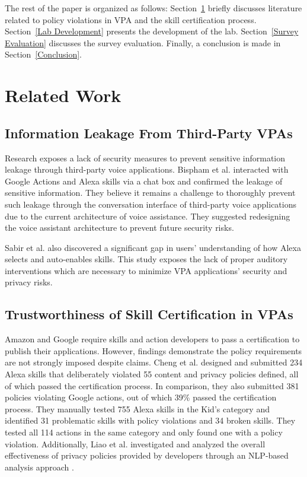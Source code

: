 \documentclass{article}
\begin{document}
The rest of the paper is organized as follows: Section~\ref{Related Work} briefly discusses literature related to policy violations in VPA and the skill certification process. Section~\ref{Lab Development} presents the development of the lab. Section~\ref{Survey Evaluation} discusses the survey evaluation. Finally, a conclusion is made in Section~\ref{Conclusion}.

\section{Related Work}\label{Related Work}

\subsection{Information Leakage From Third-Party VPAs}
Research exposes a lack of security measures to prevent sensitive information leakage through third-party voice applications. Bispham et al. interacted with Google Actions and Alexa skills via a chat box and confirmed the leakage of sensitive information\cite{Bispham}. They believe it remains a challenge to thoroughly prevent such leakage through the conversation interface of third-party voice applications due to the current architecture of voice assistance. They suggested redesigning the voice assistant architecture to prevent future security risks.

Sabir et al. also discovered a significant gap in users' understanding of how Alexa selects and auto-enables skills\cite{Sabir}. This study exposes the lack of proper auditory interventions which are necessary to minimize VPA applications' security and privacy risks.

\subsection{Trustworthiness of Skill Certification in VPAs}
Amazon and Google require skills and action developers to pass a certification to publish their applications. However, findings demonstrate the policy requirements are not strongly imposed despite claims. Cheng et al. designed and submitted 234 Alexa skills that deliberately violated 55 content and privacy policies defined, all of which passed the certification process\cite{Cheng}. In comparison, they also submitted 381 policies violating Google actions, out of which 39\% passed the certification process. They manually tested 755 Alexa skills in the Kid's category and identified 31 problematic skills with policy violations and 34 broken skills. They tested all 114 actions in the same category and only found one with a policy violation. Additionally, Liao et al. investigated and analyzed the overall effectiveness of privacy policies provided by developers through an NLP-based analysis approach \cite{Liao}. 
\end{document}

